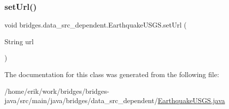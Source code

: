 \mbox{\label{classbridges_1_1data__src__dependent_1_1_earthquake_u_s_g_s_aaa9d26333e7b80d0f72da58ea2ad41d1}} 
\subsubsection{\texorpdfstring{set\+Url()}{setUrl()}}
{\footnotesize\ttfamily void bridges.\+data\+\_\+src\+\_\+dependent.\+Earthquake\+U\+S\+G\+S.\+set\+Url (\begin{DoxyParamCaption}\item[{String}]{url }\end{DoxyParamCaption})}



The documentation for this class was generated from the following file\+:\begin{DoxyCompactItemize}
\item 
/home/erik/work/bridges/bridges-\/java/src/main/java/bridges/data\+\_\+src\+\_\+dependent/\hyperlink{_earthquake_u_s_g_s_8java}{Earthquake\+U\+S\+G\+S.\+java}\end{DoxyCompactItemize}
